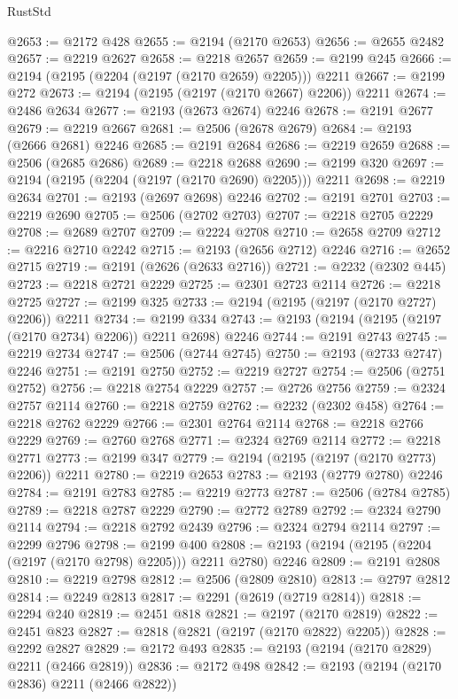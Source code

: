 \begin{lexlean}{RustStd}
\begin{coremodule}
@2653 := @2172 @428
@2655 := @2194 (@2170 @2653)
@2656 := @2655 @2482
@2657 := @2219 @2627
@2658 := @2218 @2657
@2659 := @2199 @245
@2666 := @2194 (@2195 (@2204 (@2197 (@2170 @2659) @2205))) @2211
@2667 := @2199 @272
@2673 := @2194 (@2195 (@2197 (@2170 @2667) @2206)) @2211
@2674 := @2486 @2634
@2677 := @2193 (@2673 @2674) @2246
@2678 := @2191 @2677
@2679 := @2219 @2667
@2681 := @2506 (@2678 @2679)
@2684 := @2193 (@2666 @2681) @2246
@2685 := @2191 @2684
@2686 := @2219 @2659
@2688 := @2506 (@2685 @2686)
@2689 := @2218 @2688
@2690 := @2199 @320
@2697 := @2194 (@2195 (@2204 (@2197 (@2170 @2690) @2205))) @2211
@2698 := @2219 @2634
@2701 := @2193 (@2697 @2698) @2246
@2702 := @2191 @2701
@2703 := @2219 @2690
@2705 := @2506 (@2702 @2703)
@2707 := @2218 @2705 @2229
@2708 := @2689 @2707
@2709 := @2224 @2708
@2710 := @2658 @2709
@2712 := @2216 @2710 @2242
@2715 := @2193 (@2656 @2712) @2246
@2716 := @2652 @2715
@2719 := @2191 (@2626 (@2633 @2716))
@2721 := @2232 (@2302 @445)
@2723 := @2218 @2721 @2229
@2725 := @2301 @2723 @2114
@2726 := @2218 @2725
@2727 := @2199 @325
@2733 := @2194 (@2195 (@2197 (@2170 @2727) @2206)) @2211
@2734 := @2199 @334
@2743 := @2193 (@2194 (@2195 (@2197 (@2170 @2734) @2206)) @2211 @2698) @2246
@2744 := @2191 @2743
@2745 := @2219 @2734
@2747 := @2506 (@2744 @2745)
@2750 := @2193 (@2733 @2747) @2246
@2751 := @2191 @2750
@2752 := @2219 @2727
@2754 := @2506 (@2751 @2752)
@2756 := @2218 @2754 @2229
@2757 := @2726 @2756
@2759 := @2324 @2757 @2114
@2760 := @2218 @2759
@2762 := @2232 (@2302 @458)
@2764 := @2218 @2762 @2229
@2766 := @2301 @2764 @2114
@2768 := @2218 @2766 @2229
@2769 := @2760 @2768
@2771 := @2324 @2769 @2114
@2772 := @2218 @2771
@2773 := @2199 @347
@2779 := @2194 (@2195 (@2197 (@2170 @2773) @2206)) @2211
@2780 := @2219 @2653
@2783 := @2193 (@2779 @2780) @2246
@2784 := @2191 @2783
@2785 := @2219 @2773
@2787 := @2506 (@2784 @2785)
@2789 := @2218 @2787 @2229
@2790 := @2772 @2789
@2792 := @2324 @2790 @2114
@2794 := @2218 @2792 @2439
@2796 := @2324 @2794 @2114
@2797 := @2299 @2796
@2798 := @2199 @400
@2808 := @2193 (@2194 (@2195 (@2204 (@2197 (@2170 @2798) @2205))) @2211 @2780) @2246
@2809 := @2191 @2808
@2810 := @2219 @2798
@2812 := @2506 (@2809 @2810)
@2813 := @2797 @2812
@2814 := @2249 @2813
@2817 := @2291 (@2619 (@2719 @2814))
@2818 := @2294 @240
@2819 := @2451 @818
@2821 := @2197 (@2170 @2819)
@2822 := @2451 @823
@2827 := @2818 (@2821 (@2197 (@2170 @2822) @2205))
@2828 := @2292 @2827
@2829 := @2172 @493
@2835 := @2193 (@2194 (@2170 @2829) @2211 (@2466 @2819))
@2836 := @2172 @498
@2842 := @2193 (@2194 (@2170 @2836) @2211 (@2466 @2822))

\end{coremodule}
\end{lexlean}
